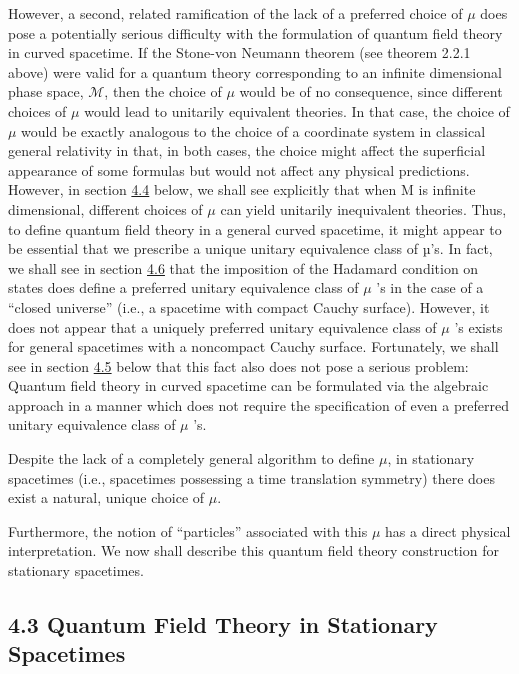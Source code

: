 \documentclass[11pt,a4paper]{article}
\begin{document}
However, a second, related ramification of the lack of a preferred choice of \(\mu\) does pose a potentially serious difficulty with the formulation of quantum field theory in curved spacetime. If the Stone-von Neumann theorem (see theorem 2.2.1 above) were valid for a quantum theory corresponding to an infinite dimensional phase space, \(\mathcal{M}\), then the choice of \(\mu\) would be of no consequence, since different choices of \(\mu\) would lead to unitarily equivalent theories. In that case, the choice of \(\mu\) would be exactly analogous to the choice of a coordinate system in classical general relativity in that, in both cases, the choice might affect the superficial appearance of some formulas but would not affect any physical predictions. However, in section \hyperlink{sec:4.4}{4.4} below, we shall see explicitly that when M is infinite dimensional, different choices of \(\mu\) can yield unitarily inequivalent theories. Thus, to define quantum field theory in a general curved spacetime, it might appear to be essential that we prescribe a unique unitary equivalence class of µ's. In fact, we shall see in section \hyperlink{sec:4.6}{4.6} that the imposition of the Hadamard condition on states does define a preferred unitary equivalence class of \(\mu\) 's in the case of a ``closed universe'' (i.e., a spacetime with compact Cauchy surface). However, it does not appear that a uniquely preferred unitary equivalence class of \(\mu\) 's exists for general spacetimes with a noncompact Cauchy surface. Fortunately, we shall see in section \hyperlink{sec:4.5}{4.5} below that this fact also does not pose a serious problem: Quantum field theory in curved spacetime can be formulated via the algebraic approach in a manner which does not require the specification of even a preferred unitary equivalence class of \(\mu\) 's.

Despite the lack of a completely general algorithm to define \(\mu\), in stationary spacetimes (i.e., spacetimes possessing a time translation symmetry) there does exist a natural, unique choice of \(\mu\).

\hypertarget{source-74}{}

Furthermore, the notion of ``particles'' associated with this \(\mu\) has a direct physical interpretation. We now shall describe this quantum field theory construction for stationary spacetimes.

\subsection*{4.3 Quantum Field Theory in Stationary Spacetimes}\hypertarget{sec:4.3}{}
\end{document}
